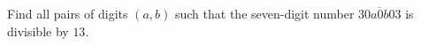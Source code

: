 Find all pairs of digits $(a,b)$ such that the seven-digit number $\overline{30a0b03}$ is divisible by $13$.
